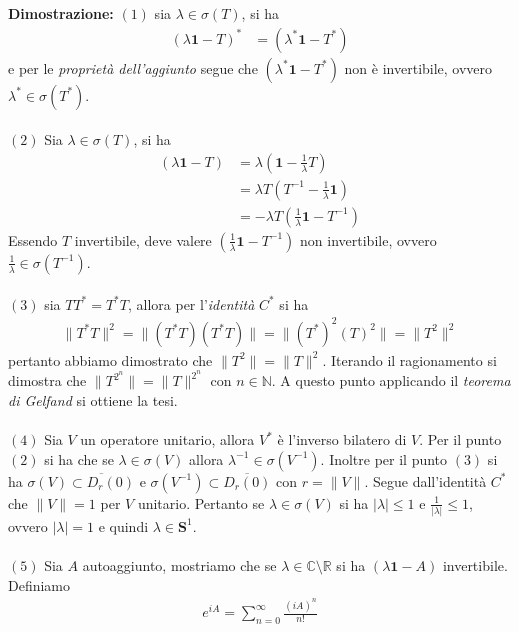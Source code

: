\documentclass{article}
\numberwithin{equation}{subsection}
\begin{document}
\textbf{Dimostrazione:} $(1)$ sia $\lambda \in \sigma(T)$, si ha 
\begin{align*}
    (\lambda\mathbf{1}- T)^* &= (\lambda^*\mathbf{1} - T^*) 
\end{align*}
e per le \textit{proprietà dell'aggiunto} segue che $(\lambda^*\mathbf{1} - T^*)$ non è invertibile, ovvero $\lambda^* \in \sigma(T^*)$. \\ \\
$(2)$ Sia $\lambda \in \sigma(T)$, si ha 
\begin{align*}
    (\lambda\mathbf{1} - T) &= \lambda\left(\mathbf{1} - \frac{1}{\lambda}T\right)  \\
    &= \lambda T\left(T^{-1} - \frac{1}{\lambda}\mathbf{1}\right)  \\
    &= -\lambda T\left(\frac{1}{\lambda}\mathbf{1} - T^{-1}\right) 
\end{align*}
Essendo $T$ invertibile, deve valere $\left(\frac{1}{\lambda}\mathbf{1} - T^{-1}\right)$ non invertibile, ovvero $\frac{1}{\lambda} \in \sigma(T^{-1})$. \\ \\
$(3)$ sia $TT^* = T^*T$, allora per l'\textit{identità} $C^*$ si ha 
\begin{align*}
    \|T^*T\|^2 = \|(T^*T)(T^*T)\| = \|(T^*)^2(T)^2\| = \|T^2\|^2 
\end{align*}
pertanto abbiamo dimostrato che $\|T^2\| = \|T\|^2$. Iterando il ragionamento si dimostra che $\|T^{2^n}\| = \|T\|^{2^n}$ con $n \in \mathbb{N}$. A questo punto applicando il \textit{teorema di Gelfand} si ottiene la tesi. \\ \\
$(4)$ Sia $V$ un operatore unitario, allora $V^*$ è l'inverso bilatero di $V$. Per il punto $(2)$ si ha che se $\lambda \in \sigma(V)$ allora $\lambda^{-1} \in \sigma(V^{-1})$. Inoltre per il punto $(3)$ si ha $\sigma(V) \overline{\subset D_r(0)}$ e $\sigma(V^{-1}) \subset \overline{D_r(0)}$ con $r = \|V\|$. Segue dall'identità $C^*$ che $\|V\| = 1$ per $V$ unitario. Pertanto se $\lambda \in \sigma(V)$ si ha $|\lambda| \leq 1$ e $\frac{1}{|\lambda|} \leq 1$, ovvero $|\lambda| = 1$ e quindi $\lambda \in \mathbf{S}^1$. \\ \\
$(5)$ Sia $A$ autoaggiunto, mostriamo che se $\lambda \in \mathbb{C} \setminus \mathbb{R}$ si ha $(\lambda\mathbf{1} - A)$ invertibile. Definiamo 
\begin{align*}
    e^{iA} = \sum_{n = 0}^\infty \frac{(iA)^n}{n!} 
\end{align*}
\end{document}
